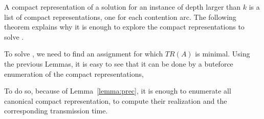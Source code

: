\documentclass[english]{article}
\begin{document}
A compact representation of a solution for an instance of depth larger than $k$
is a list of compact representations, one for each contention arc. The following theorem explains why it is enough to explore the compact representations to solve \spall.



To solve \spall, we need to find an assignment for which $TR(A)$ is minimal. Using the previous Lemmas, it is easy to see
that it can be done by a buteforce enumeration of the compact representations, 

To do so, because of Lemma~\ref{lemma:prec}, it is enough to 
enumerate all canonical compact representation, to compute their realization and the corresponding transmission time.


\end{document}
